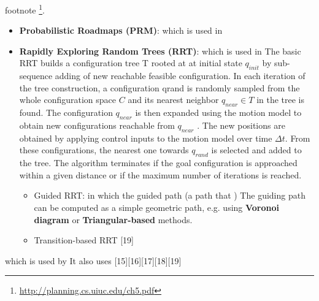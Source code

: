 \documentclass{article}
\begin{document}
			footnote \footnote{\url{http://planning.cs.uiuc.edu/ch5.pdf}}.
			\begin{itemize}
				\item \textbf{Probabilistic Roadmaps (PRM)}: \cite{lavalle-1998-rapidly-exploring-random-trees-a-new-tool-for-path-planning} which is used in \cite{spurny-2019-cooperative-transport-of-large-objects-by-a-pair-of-unmanned-aerial-systems-using-sampling-based-motion-planning}
				\item \textbf{Rapidly Exploring Random Trees (RRT)}: \cite{kavraki-1996-probabilistic-roadmaps-for-path-planning-in-high-dimensional-configuration-spaces} which is used in \cite{spurny-2019-cooperative-transport-of-large-objects-by-a-pair-of-unmanned-aerial-systems-using-sampling-based-motion-planning}
				The basic RRT builds a configuration tree T rooted at at initial state $q_{init}$ by sub-sequence adding of new reachable feasible configuration. In each iteration of the tree construction, a configuration qrand is randomly sampled from the whole
				configuration space $C$ and its nearest neighbor $q_{near} \in T$ in the tree is found. The configuration $q_{near}$ is then expanded using the motion model to obtain new configurations reachable from $q_{near}$ . The new positions are obtained by applying control inputs to the motion model over time $\Delta t$. From these configurations, the nearest one towards $q_{rand}$ is selected and added to the tree. The algorithm terminates if the goal configuration is approached within a given distance or if the maximum number of iterations is reached.
					\begin{itemize}
						\item Guided RRT: \cite{vonasek-2009-rrt-path-a-guided-rapidly-exploring-random-tree} in which the guided path (a path that ) The guiding path can be computed
						as a simple geometric path, e.g. using \textbf{Voronoi diagram} or
						\textbf{Triangular-based} methods.
						\item Transition-based RRT \cite{spurny-2019-cooperative-transport-of-large-objects-by-a-pair-of-unmanned-aerial-systems-using-sampling-based-motion-planning}[19]
					\end{itemize}
				
			\end{itemize}
				\cite{lavalle-1998-rapidly-exploring-random-trees-a-new-tool-for-path-planning} which is used by 
				It also uses \cite{spurny-2019-cooperative-transport-of-large-objects-by-a-pair-of-unmanned-aerial-systems-using-sampling-based-motion-planning}[15][16][17][18][19]
		
\end{document}
